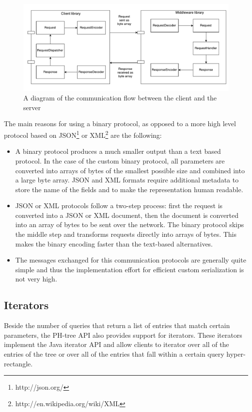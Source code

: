 \documentclass[11pt,a4paper]{globis-book}
\begin{document}
\begin{figure}[h]
    \centering 
    \includegraphics[scale=0.7]{images/Encoding}
    \caption{A diagram of the communication flow between the client and the server}
    \label{fig:Encoding}
\end{figure}

The main reasons for using a binary protocol, as opposed to a more high level protocol based on JSON\footnote{http://json.org/} or XML\footnote{http://en.wikipedia.org/wiki/XML} are the following:
\begin{itemize}
    \item A binary protocol produces a much smaller output than a text based protocol. In the case of the custom binary protocol, all parameters are converted into arrays of bytes of the smallest possible size and combined into a large byte array. JSON and XML formats require additional metadata to store the name of the fields and to make the representation human readable. 
    \item JSON or XML protocols follow a two-step process: first the request is converted into a JSON or XML document, then the document is converted into an array of bytes to be sent over the network. The binary protocol skips the middle step and transforms requests directly into arrays of bytes. This makes the binary encoding faster than the text-based alternatives.
    \item The messages exchanged for this communication protocols are generally quite simple and thus the implementation effort for efficient custom serialization is not very high. 
\end{itemize}

\subsection{Iterators}

Beside the number of queries that return a list of entries that match certain parameters, the PH-tree API also provides support for iterators. These iterators implement the Java iterator API and allow clients to iterator over all of the entries of the tree or over all of the entries that fall within a certain query hyper-rectangle.
\end{document}
